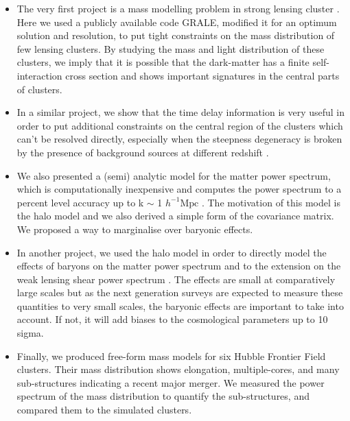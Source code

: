 \documentclass[
  11pt,
  twoside,
  openright,
  titlepage,
  headings=optiontoheadandtoc
]{scrbook}
\begin{document}
\begin{itemize}
\item The very first project is a mass modelling problem in strong lensing cluster
  \cite{2014MNRAS.439.2651M}. Here we
  used a publicly available code GRALE, modified it for an optimum solution and resolution,
  to put tight constraints on the mass distribution of few lensing clusters. By studying
  the mass and light distribution of these clusters, we imply that it is possible 
  that the dark-matter has a finite self-interaction cross section and shows
  important signatures in the central parts of clusters. 

\item In a similar project, we show that the time delay information is very useful in 
  order to put additional constraints on the central region of the clusters which can't 
  be resolved directly, especially when the steepness degeneracy is broken by the 
  presence of background sources at different redshift \cite{2015PASJ...67...21M}.

\item We also presented a (semi) analytic model for the matter power spectrum, which is
  computationally inexpensive and computes the power spectrum to a percent level 
  accuracy up to k $\sim$ 1 $h^{-1}\mathrm{Mpc}$ \cite{2014MNRAS.445.3382M}. 
  The motivation of this model is the halo model
  and we also derived a simple form of the covariance matrix. We proposed a way to 
  marginalise over baryonic effects. 

\item In another project, we used the halo model in order to directly
  model the effects of baryons on the matter power spectrum and to the extension on the
  weak lensing shear power spectrum \cite{2014arXiv1410.6826M}. 
  The effects are small at comparatively large
  scales but as the next generation surveys are expected to measure these quantities 
  to very small scales, the baryonic effects are important to take into account. If not, 
  it will add biases to the cosmological parameters up to 10 sigma. 

\item Finally, we produced free-form mass models for six Hubble Frontier Field clusters.
  Their mass distribution shows elongation, multiple-cores, and many sub-structures
  indicating a recent major merger. We measured the power spectrum of the mass 
  distribution to quantify the sub-structures, and compared them to the simulated
  clusters.
\end{itemize}
\end{document}
